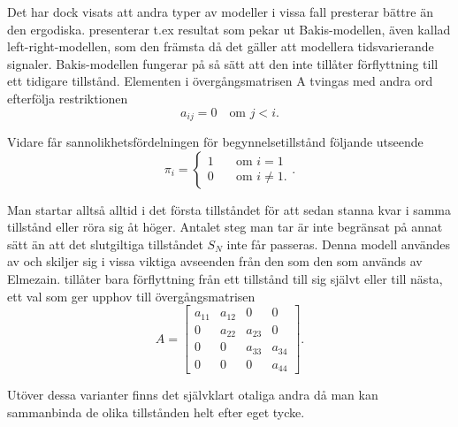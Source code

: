 \documentclass[../rapport_MVEX01-11-05]{subfiles}
\begin{document}
Det har dock visats att andra typer av modeller i vissa fall presterar
bättre än den ergodiska. 
presenterar t.ex resultat som pekar ut Bakis-modellen, även kallad
left-right-modellen, som den främsta då det gäller att modellera
tidsvarierande signaler. Bakis-modellen fungerar på så sätt att den
inte tillåter förflyttning till ett tidigare tillstånd. Elementen i
övergångsmatrisen A tvingas med andra ord efterfölja restriktionen
\begin{equation*}
a_{ij} = 0 \quad\text{om }j<i.
\end{equation*}

Vidare får sannolikhetsfördelningen för begynnelsetillstånd följande
utseende
\begin{equation*}
\pi_i = \begin{cases}
         1 & \quad\text{om } i = 1\\
         0 & \quad\text{om } i \neq 1.\end{cases}.
\end{equation*}  

Man startar alltså alltid i det första tillståndet för att sedan
stanna kvar i samma tillstånd eller röra sig åt höger. Antalet steg
man tar är inte begränsat på annat sätt än att det slutgiltiga
tillståndet $S_N$ inte får passeras. Denna modell användes av 
 och skiljer sig i vissa viktiga avseenden från
den som den som används av Elmezain.  tillåter bara förflyttning från
ett tillstånd till sig självt eller till nästa, ett val som ger upphov
till övergångsmatrisen
\begin{equation*}
A = \begin{bmatrix}
a_{11} & a_{12} & 0 & 0\\
0 & a_{22} & a_{23} & 0\\
0 & 0 & a_{33} & a_{34}\\
0 & 0 & 0 & a_{44}
\end{bmatrix}.  
\end{equation*} 

Utöver dessa varianter finns det självklart otaliga andra då man kan
sammanbinda de olika tillstånden helt efter eget tycke.  
\end{document}
